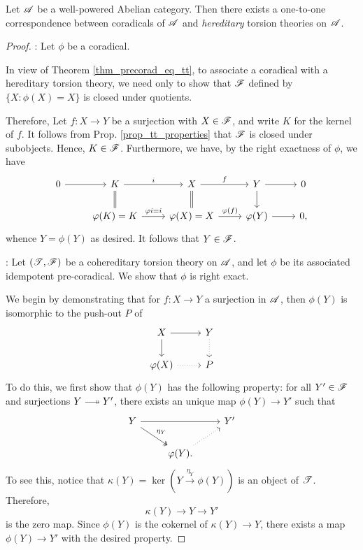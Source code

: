 \begin{thm}\label{thm_corad_equiv_htt}
Let $\mathscr{A}$ be a well-powered Abelian category. Then there 
exists a one-to-one correspondence between coradicals of $\mathscr{A}$ 
and \emph{hereditary} torsion theories on $\mathscr{A}$.
\end{thm}
\begin{proof}

 : Let 
$\phi$ be a coradical.

In view of Theorem \ref{thm_precorad_eq_tt}, to associate a 
coradical with a hereditary torsion theory, we need only to show
that $\mathscr{F}$ defined by $\{X : \phi(X) = X\}$ is closed under
quotients.

Therefore, Let $f: X \to Y$ be a surjection with $X \in \mathscr{F}$,
and write $K$ for the kernel of $f$. It follows from Prop. 
\ref{prop_tt_properties} that $\mathscr{F}$ is closed under 
subobjects. Hence, $K \in \mathscr{F}$. Furthermore, we have, by the
right exactness of $\phi$, we have
\[
\begin{tikzcd}
0 \arrow{r} & 
K \arrow{r}{i} \arrow[equals]{d} &
X \arrow{r}{f} \arrow[equals]{d} &
Y \arrow{r} \arrow{d} &
0 \\
& \phi(K) = K \arrow{r}{\phi i = i} &
\phi(X) = X \arrow{r}{\phi(f)} &
\phi(Y) \arrow{r} &
0,
\end{tikzcd}
\]
whence $Y = \phi(Y)$ as desired. It follows that $Y \in \mathscr{F}$.

 : Let
$(\mathscr{T}, \mathscr{F})$ be a cohereditary torsion theory on $\mathscr{A}$,
and let $\phi$ be its associated idempotent pre-coradical. We show
that $\phi$ is right exact.

We begin by demonstrating that for $f: X \to Y$ a surjection in 
$\mathscr{A}$, then $\phi(Y)$ is isomorphic to the push-out $P$ of
\[
\begin{tikzcd}
X \arrow{r} \arrow{d} & Y \arrow[dotted]{d}\\
\phi(X) \arrow[dotted]{r} & P
\end{tikzcd}
\]
To do this, we first show that $\phi(Y)$ has the following 
property: for all $Y' \in \mathscr{F}$ and surjections $Y \onto Y'$, 
there exists an unique map $\phi(Y) \to Y'$ such that
\[
\begin{tikzcd}
Y \arrow[twoheadrightarrow]{rd}{\eta_Y} \arrow{rr} & & Y' \\
&\phi(Y) \arrow[dotted]{ru}.
\end{tikzcd}
\]
To see this, notice that $\kappa(Y) = \ker( Y 
\stackrel{\eta_Y}{\to} \phi(Y))$ is an object of $\mathscr{T}$.
Therefore,
\[
\kappa(Y) \to Y \to Y'
\]
is the zero map. Since $\phi(Y)$ is the cokernel of $\kappa(Y)
\to Y$, there exists a map $\phi(Y) \to Y'$ with the desired 
property.


\end{proof}
